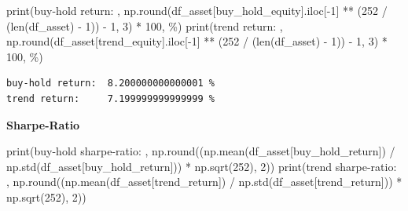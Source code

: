 \documentclass[
  letterpaper,
  DIV=11,
  numbers=noendperiod]{scrreprt}
\newenvironment{Shaded}{\begin{snugshade}}{\end{snugshade}}
\newcommand{\BuiltInTok}[1]{\textcolor[rgb]{0.00,0.23,0.31}{#1}}
\newcommand{\DecValTok}[1]{\textcolor[rgb]{0.68,0.00,0.00}{#1}}
\newcommand{\NormalTok}[1]{\textcolor[rgb]{0.00,0.23,0.31}{#1}}
\newcommand{\OperatorTok}[1]{\textcolor[rgb]{0.37,0.37,0.37}{#1}}
\newcommand{\StringTok}[1]{\textcolor[rgb]{0.13,0.47,0.30}{#1}}
\begin{document}
\begin{Shaded}
\begin{Highlighting}[]
\BuiltInTok{print}\NormalTok{(}\StringTok{\textquotesingle{}buy{-}hold return: \textquotesingle{}}\NormalTok{, np.}\BuiltInTok{round}\NormalTok{(df\_asset[}\StringTok{\textquotesingle{}buy\_hold\_equity\textquotesingle{}}\NormalTok{].iloc[}\OperatorTok{{-}}\DecValTok{1}\NormalTok{] }\OperatorTok{**}\NormalTok{ (}\DecValTok{252} \OperatorTok{/}\NormalTok{ (}\BuiltInTok{len}\NormalTok{(df\_asset) }\OperatorTok{{-}} \DecValTok{1}\NormalTok{)) }\OperatorTok{{-}} \DecValTok{1}\NormalTok{, }\DecValTok{3}\NormalTok{) }\OperatorTok{*} \DecValTok{100}\NormalTok{, }\StringTok{\textquotesingle{}\%\textquotesingle{}}\NormalTok{)}
\BuiltInTok{print}\NormalTok{(}\StringTok{\textquotesingle{}trend return:    \textquotesingle{}}\NormalTok{, np.}\BuiltInTok{round}\NormalTok{(df\_asset[}\StringTok{\textquotesingle{}trend\_equity\textquotesingle{}}\NormalTok{].iloc[}\OperatorTok{{-}}\DecValTok{1}\NormalTok{] }\OperatorTok{**}\NormalTok{ (}\DecValTok{252} \OperatorTok{/}\NormalTok{ (}\BuiltInTok{len}\NormalTok{(df\_asset) }\OperatorTok{{-}} \DecValTok{1}\NormalTok{)) }\OperatorTok{{-}} \DecValTok{1}\NormalTok{, }\DecValTok{3}\NormalTok{) }\OperatorTok{*} \DecValTok{100}\NormalTok{, }\StringTok{\textquotesingle{}\%\textquotesingle{}}\NormalTok{)}
\end{Highlighting}
\end{Shaded}

\begin{verbatim}
buy-hold return:  8.200000000000001 %
trend return:     7.199999999999999 %
\end{verbatim}

\textbf{Sharpe-Ratio}

\begin{Shaded}
\begin{Highlighting}[]
\BuiltInTok{print}\NormalTok{(}\StringTok{\textquotesingle{}buy{-}hold sharpe{-}ratio: \textquotesingle{}}\NormalTok{, np.}\BuiltInTok{round}\NormalTok{((np.mean(df\_asset[}\StringTok{\textquotesingle{}buy\_hold\_return\textquotesingle{}}\NormalTok{]) }\OperatorTok{/}\NormalTok{ np.std(df\_asset[}\StringTok{\textquotesingle{}buy\_hold\_return\textquotesingle{}}\NormalTok{])) }\OperatorTok{*}\NormalTok{ np.sqrt(}\DecValTok{252}\NormalTok{), }\DecValTok{2}\NormalTok{))}
\BuiltInTok{print}\NormalTok{(}\StringTok{\textquotesingle{}trend sharpe{-}ratio:    \textquotesingle{}}\NormalTok{, np.}\BuiltInTok{round}\NormalTok{((np.mean(df\_asset[}\StringTok{\textquotesingle{}trend\_return\textquotesingle{}}\NormalTok{]) }\OperatorTok{/}\NormalTok{ np.std(df\_asset[}\StringTok{\textquotesingle{}trend\_return\textquotesingle{}}\NormalTok{])) }\OperatorTok{*}\NormalTok{ np.sqrt(}\DecValTok{252}\NormalTok{), }\DecValTok{2}\NormalTok{))}
\end{Highlighting}
\end{Shaded}
\end{document}
